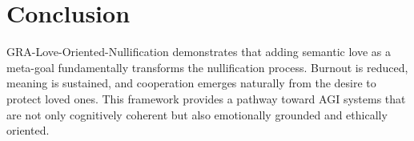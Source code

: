 \documentclass{article}
\begin{document}
\section{Conclusion}

GRA-Love-Oriented-Nullification demonstrates that adding semantic love as a meta-goal fundamentally transforms the nullification process. Burnout is reduced, meaning is sustained, and cooperation emerges naturally from the desire to protect loved ones. This framework provides a pathway toward AGI systems that are not only cognitively coherent but also emotionally grounded and ethically oriented.



\end{document}
